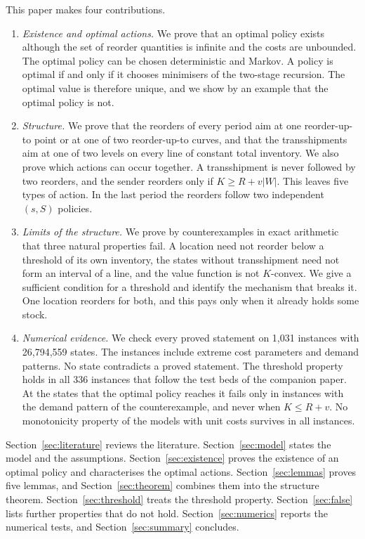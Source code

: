 \documentclass[11pt]{article}
\theoremstyle{definition}
\begin{document}
This paper makes four contributions.
\begin{enumerate}
\item \emph{Existence and optimal actions.} We prove that an optimal policy exists although the set of reorder quantities is infinite and the costs are unbounded. The optimal policy can be chosen deterministic and Markov. A policy is optimal if and only if it chooses minimisers of the two-stage recursion. The optimal value is therefore unique, and we show by an example that the optimal policy is not.
\item \emph{Structure.} We prove that the reorders of every period aim at one reorder-up-to point or at one of two reorder-up-to curves, and that the transshipments aim at one of two levels on every line of constant total inventory. We also prove which actions can occur together. A transshipment is never followed by two reorders, and the sender reorders only if $K\ge R+v|W|$. This leaves five types of action. In the last period the reorders follow two independent $(s,S)$ policies.
\item \emph{Limits of the structure.} We prove by counterexamples in exact arithmetic that three natural properties fail. A location need not reorder below a threshold of its own inventory, the states without transshipment need not form an interval of a line, and the value function is not $K$-convex. We give a sufficient condition for a threshold and identify the mechanism that breaks it. One location reorders for both, and this pays only when it already holds some stock.
\item \emph{Numerical evidence.} We check every proved statement on 1,031 instances with 26,794,559 states. The instances include extreme cost parameters and demand patterns. No state contradicts a proved statement. The threshold property holds in all 336 instances that follow the test beds of the companion paper. At the states that the optimal policy reaches it fails only in instances with the demand pattern of the counterexample, and never when $K\le R+v$. No monotonicity property of the models with unit costs survives in all instances.
\end{enumerate}

Section~\ref{sec:literature} reviews the literature. Section~\ref{sec:model} states the model and the assumptions. Section~\ref{sec:existence} proves the existence of an optimal policy and characterises the optimal actions. Section~\ref{sec:lemmas} proves five lemmas, and Section~\ref{sec:theorem} combines them into the structure theorem. Section~\ref{sec:threshold} treats the threshold property. Section~\ref{sec:false} lists further properties that do not hold. Section~\ref{sec:numerics} reports the numerical tests, and Section~\ref{sec:summary} concludes.
\end{document}
